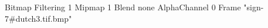 {Bitmap
	{Filtering 1}
	{Mipmap 1}
	{Blend none}
	{AlphaChannel 0}
	{Frame "sign-7#dutch3.tif.bmp"}
}
